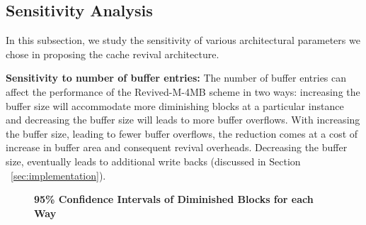 




\subsection{Sensitivity Analysis}
In this subsection, we study the sensitivity of various architectural parameters we chose in proposing the cache revival architecture.

\noindent\textbf{Sensitivity to number of buffer entries:}
The number of buffer entries can affect the performance of the Revived-M-4MB scheme in two ways: increasing the
buffer size will accommodate more diminishing blocks at a particular instance and decreasing the buffer size will
leads to more buffer overflows. With increasing the buffer size, leading to fewer buffer overflows,
the reduction comes at a cost of increase in buffer area and consequent revival overheads. Decreasing the buffer size, eventually
leads to additional write backs (discussed in Section ~\ref{sec:implementation}).



\begin{figure*} [t]
\centering
 \caption{\label{fig:confi} \scriptsize \bf 95\% Confidence Intervals of Diminished Blocks for each Way}
\end{figure*}

